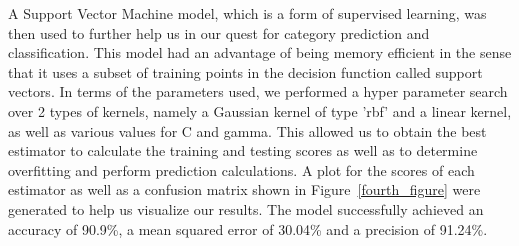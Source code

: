 \documentclass[10pt,twocolumn,letterpaper]{article}
\begin{document}
\begin{figure}[h]
\begin{center}
   \end{center}
        \vspace*{-5mm}
        \caption{\label{third_figure}}
\end{figure}

A Support Vector Machine model, which is a form of supervised learning, was then used to further help us in our quest for category prediction and classification. This model had an advantage of being memory efficient in the sense that it uses a subset of training points in the decision function called support vectors. In terms of the parameters used, we performed a hyper parameter search over 2 types of kernels, namely a Gaussian kernel of type 'rbf' and a linear kernel, as well as various values for C and gamma. This allowed us to obtain the best estimator to calculate the training and testing scores as well as to determine overfitting and perform prediction calculations. A plot for the scores of each estimator as well as a confusion matrix shown in Figure~\ref{fourth_figure} were generated to help us visualize our results. The model successfully achieved an accuracy of 90.9\%, a mean squared error of 30.04\% and a precision of 91.24\%.
\end{document}
